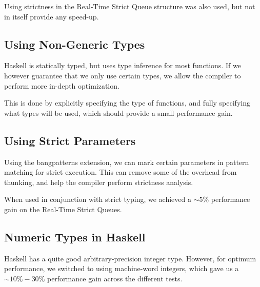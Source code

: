 Using strictness in the Real-Time Strict Queue structure was also used, but not in itself provide any speed-up.

\subsection{Using Non-Generic Types}

Haskell is statically typed, but uses type inference for most functions. If we however guarantee that we only use certain types, we allow the compiler to perform more in-depth optimization. 

This is done by explicitly specifying the type of functions, and fully specifying what types will be used, which should provide a small performance gain.

\subsection{Using Strict Parameters}

Using the bangpatterns extension, we can mark certain parameters in pattern matching for strict execution. This can remove some of the overhead from thunking, and help the compiler perform strictness analysis.

When used in conjunction with strict typing, we achieved a $\sim 5\%$ performance gain on the Real-Time Strict Queues.

\subsection{Numeric Types in Haskell}

Haskell has a quite good arbitrary-precision integer type. However, for optimum performance, we switched to using machine-word integers, which gave us a $\sim 10\%-30\%$ performance gain across the different tests.

